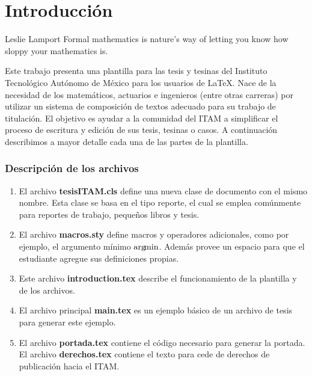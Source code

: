 \chapter{Introducción}
\label{ch:intro}

\begin{chapterquote}{Leslie Lamport}
	Formal mathematics is nature's way of letting you know how sloppy
your mathematics is.
\end{chapterquote}

Este trabajo presenta una plantilla para las tesis y tesinas del Instituto Tecnológico Autónomo de México para los usuarios de \LaTeX. Nace de la necesidad de los matemáticos, actuarios e ingenieros (entre otras carreras) por utilizar un sistema de composición de textos adecuado para su trabajo de titulación. El objetivo es ayudar a la comunidad del ITAM a simplificar el proceso de escritura y edición de sus tesis, tesinas o casos. A continuación describimos a mayor detalle cada una de las partes de la plantilla.

\subsection{Descripción de los archivos}
\begin{enumerate}
\item El archivo \textbf{tesisITAM.cls} define una nueva clase de documento con el mismo nombre. Esta clase se basa en el tipo reporte, el cual se emplea comúnmente para reportes de trabajo, pequeños libros y tesis.

\item El archivo \textbf{macros.sty} define macros y operadores adicionales, como por ejemplo, el argumento mínimo $\operatorname*{arg\! min}$. Además provee un espacio para que el estudiante agregue sus definiciones propias.

\item Este archivo \textbf{introduction.tex} describe el funcionamiento de la plantilla y de los archivos. 

\item El archivo principal \textbf{main.tex} es un ejemplo básico de un archivo de tesis para generar este ejemplo.

\item El archivo \textbf{portada.tex} contiene el código necesario para generar la portada. El archivo \textbf{derechos.tex} contiene el texto para cede de derechos de publicación hacia el ITAM.
\end{enumerate}

